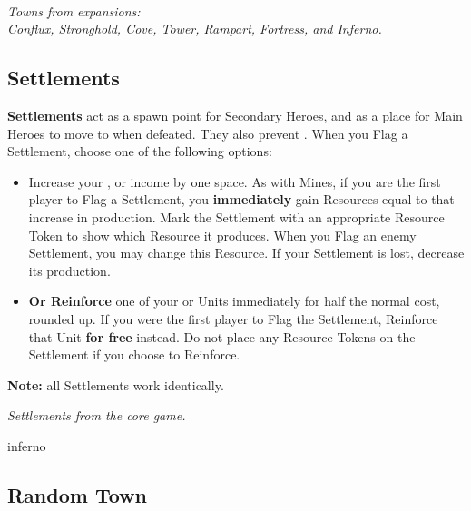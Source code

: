 \vspace*{\fill}
\begin{center}
  \\
  \textit{Towns from expansions:\\Conflux, Stronghold, Cove, Tower, Rampart, Fortress, and Inferno.}
\end{center}
\pagebreak

\begin{multicols}{2}
\subsection*{Settlements}
\textbf{Settlements} act as a spawn point for Secondary Heroes, and as a place for Main Heroes to move to when defeated.
They also prevent .
When you Flag a Settlement, choose one of the following options:
\begin{itemize}
  \item Increase your ,  or  income by one space.
    As with Mines, if you are the first player to Flag a Settlement, you \textbf{immediately} gain Resources equal to that increase in production.
      Mark the Settlement with an appropriate Resource Token to show which Resource it produces.
      When you Flag an enemy Settlement, you may change this Resource.
      If your Settlement is lost, decrease its production.
  \item \textbf{Or Reinforce} one of your  or  Units immediately for half the normal cost, rounded up.
    If you were the first player to Flag the Settlement, Reinforce that Unit \textbf{for free} instead.
    Do not place any Resource Tokens on the Settlement if you choose to Reinforce.
\end{itemize}
\textbf{Note:} all Settlements work identically.

\begin{center}
  \textit{Settlements from the core game.}
\end{center}

\vspace*{\fill}
\columnbreak

\begin{expansion}[before=\vspace*{-11mm}]{inferno}
  \subsection*{Random Town}


\end{expansion}
\end{multicols}
